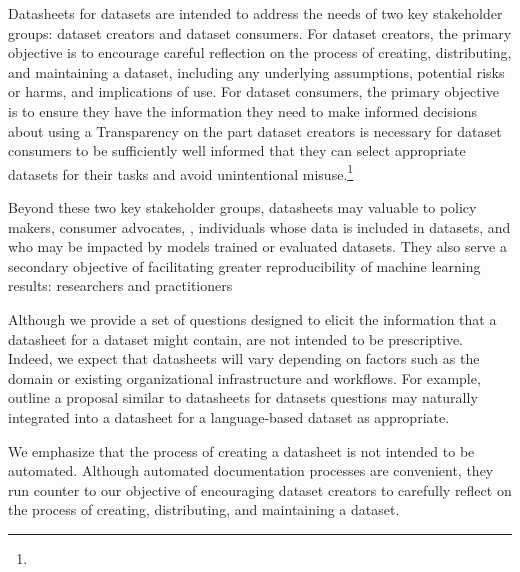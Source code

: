 Datasheets for datasets are intended to address the needs of two key
stakeholder groups: dataset creators and dataset consumers. For
dataset creators, the primary objective is to encourage careful
reflection on the process of creating, distributing, and maintaining a
dataset, including any underlying assumptions, potential risks or
harms, and implications of use. For dataset consumers, the primary
objective is to ensure they have the information they need to make
informed decisions about using a  Transparency on the
part  dataset creators is necessary for dataset consumers to
be sufficiently well informed that they can select appropriate
datasets for their
 tasks and avoid unintentional misuse.\footnote{}

Beyond these two key stakeholder groups, datasheets  may
 valuable to policy makers, consumer advocates, , individuals whose data is included in datasets, and
 who may be impacted by models trained or evaluated  datasets. They also serve a secondary objective of facilitating
greater reproducibility of machine learning results: researchers and
practitioners 

Although we provide a set of questions designed to elicit the
information that a datasheet for a dataset might contain,  are not intended to be prescriptive. Indeed, we expect that
datasheets will  vary depending on factors such as the
domain or existing organizational infrastructure and workflows. For
example,
~\citet{statements}
outline a proposal similar to datasheets for
datasets  questions may  naturally integrated into a
datasheet for a language-based dataset as appropriate.

We emphasize that the process of creating a datasheet is not intended
to be automated. Although automated documentation processes are
convenient, they run counter to our objective of encouraging dataset
creators to carefully reflect on the process of creating,
distributing, and maintaining a dataset.
